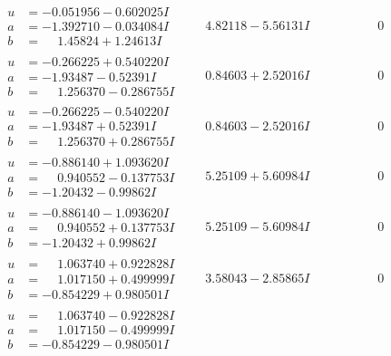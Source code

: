 \documentclass[1p]{elsarticle_modified}
\theoremstyle{definition}
\begin{document}
$$\begin{array}{c|c|c}
\begin{aligned}
u &= -0.051956 - 0.602025 I \\
a &= -1.392710 - 0.034084 I \\
b &= \phantom{-}1.45824 + 1.24613 I\end{aligned}
 & \phantom{-}4.82118 - 5.56131 I & \phantom{-0.000000 } 0 \\ \hline\begin{aligned}
u &= -0.266225 + 0.540220 I \\
a &= -1.93487 - 0.52391 I \\
b &= \phantom{-}1.256370 - 0.286755 I\end{aligned}
 & \phantom{-}0.84603 + 2.52016 I & \phantom{-0.000000 } 0 \\ \hline\begin{aligned}
u &= -0.266225 - 0.540220 I \\
a &= -1.93487 + 0.52391 I \\
b &= \phantom{-}1.256370 + 0.286755 I\end{aligned}
 & \phantom{-}0.84603 - 2.52016 I & \phantom{-0.000000 } 0 \\ \hline\begin{aligned}
u &= -0.886140 + 1.093620 I \\
a &= \phantom{-}0.940552 - 0.137753 I \\
b &= -1.20432 - 0.99862 I\end{aligned}
 & \phantom{-}5.25109 + 5.60984 I & \phantom{-0.000000 } 0 \\ \hline\begin{aligned}
u &= -0.886140 - 1.093620 I \\
a &= \phantom{-}0.940552 + 0.137753 I \\
b &= -1.20432 + 0.99862 I\end{aligned}
 & \phantom{-}5.25109 - 5.60984 I & \phantom{-0.000000 } 0 \\ \hline\begin{aligned}
u &= \phantom{-}1.063740 + 0.922828 I \\
a &= \phantom{-}1.017150 + 0.499999 I \\
b &= -0.854229 + 0.980501 I\end{aligned}
 & \phantom{-}3.58043 - 2.85865 I & \phantom{-0.000000 } 0 \\ \hline\begin{aligned}
u &= \phantom{-}1.063740 - 0.922828 I \\
a &= \phantom{-}1.017150 - 0.499999 I \\
b &= -0.854229 - 0.980501 I\end{aligned}

\end{array}$$
\end{document}
